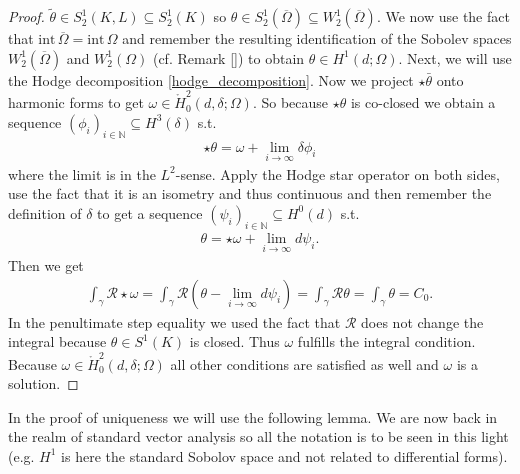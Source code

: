 \documentclass[12pt,a4paper]{article}
\numberwithin{equation}{subsection}
\numberwithin{lemma}{subsection}
\theoremstyle{definition}
\newcommand{\naturalnum}{\mathbb{N}}
\newcommand{\omegabar}{\overline{\Omega}}
\newcommand{\rop}{\mathscr{R}} %
\begin{document}
\begin{proof}
    $\tilde{\theta} \in S^1_2(K,L) \subseteq S^1_2(K)$ so 
    $\theta \in S^1_2(\omegabar) \subseteq W^1_2(\omegabar)$.
    We now use the fact that $\text{int}\,\omegabar = \text{int}\,\Omega$ and
    remember the resulting identification of the Sobolev spaces 
    $W^1_2(\omegabar)$ and $W^1_2(\Omega)$ (cf. Remark \ref{}) to obtain
    $\theta \in H^1(d;\Omega)$.
    Next, we will use the Hodge decomposition \ref{hodge_decomposition}.
    Now we project $\star\bar{\theta}$ onto harmonic forms to get 
    $\omega \in \mathring{H}^2_0(d,\delta;\Omega)$. 
    So because 
    $\star\theta$ is co-closed we 
    obtain a sequence $(\phi_i)_{i \in \naturalnum} \subseteq H^3(\delta)$ s.t.
    \begin{align*}
        \star\theta = \omega + \lim\limits_{i \rightarrow \infty}\delta \phi_i
    \end{align*}
    where the limit is in the $L^2$-sense.
    Apply the Hodge star operator on 
    both sides, use the fact that it is an isometry and thus continuous and then 
    remember the definition of $\delta$ to get a sequence 
    $(\psi_i)_{i \in \naturalnum} \subseteq H^0(d)$ s.t.
    \begin{align*}
        \theta = \star\omega + \lim\limits_{i \rightarrow \infty}d \psi_i.
    \end{align*}    
    Then we get
    \begin{align*}
        \int_\gamma \rop \star \omega 
        =\int_\gamma \rop (\theta - 
        \lim\limits_{i \rightarrow \infty}d \psi_i) = 
        \int_\gamma \rop \theta = \int_\gamma \theta = C_0.
    \end{align*}
    In the penultimate step equality we used the fact that 
    $\rop$ does not change the integral because $\theta \in S^1(K)$ is closed.
    Thus $\omega$ fulfills the integral condition. 
    Because $\omega \in \mathring{H}^2_0(d,\delta;\Omega)$ all other conditions 
    are satisfied as well and $\omega$ is a solution.
\end{proof}


In the proof of uniqueness we will use the following lemma. 
We are now back in the realm of standard vector analysis so all the notation
is to be seen in this light (e.g. $H^1$ is here the standard Sobolov space 
and not related to differential forms).
\end{document}
